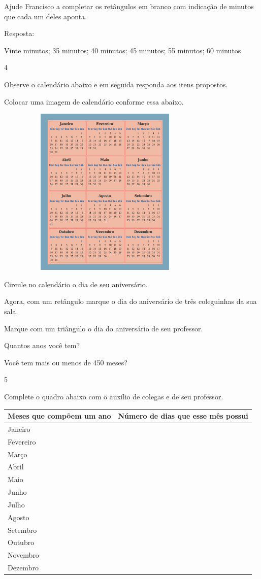 \begin{escolha}
Ajude Francisco a completar os retângulos em branco com indicação de
minutos que cada um deles aponta.

Resposta:

Vinte minutos; 35 minutos; 40 minutos; 45 minutos; 55 minutos; 60
minutos

\num{4}

Observe o calendário abaixo e em seguida responda aos itens propostos.

Colocar uma imagem de calendário conforme essa abaixo.

\includegraphics[width=4.13369in,height=3.20861in]{media/image54.png}

\begin{escolha}
\item
  Circule no calendário o dia de seu aniversário.

\item
  Agora, com um retângulo marque o dia do aniversário de três
  coleguinhas da sua sala.

\item
  Marque com um triângulo o dia do aniversário de seu professor.

\item
  Quantos anos você tem?

\item
  Você tem mais ou menos de 450 meses?
\end{escolha}

\num{5}

Complete o quadro abaixo com o auxílio de colegas e de seu professor.

\begin{longtable}[]{@{}ll@{}}
\toprule
Meses que compõem um ano & Número de dias que esse mês
possui\tabularnewline
\midrule
\endhead
Janeiro &\tabularnewline
Fevereiro &\tabularnewline
Março &\tabularnewline
Abril &\tabularnewline
Maio &\tabularnewline
Junho &\tabularnewline
Julho &\tabularnewline
Agosto &\tabularnewline
Setembro &\tabularnewline
Outubro &\tabularnewline
Novembro &\tabularnewline
Dezembro &\tabularnewline
\bottomrule
\end{longtable}


\end{escolha}
